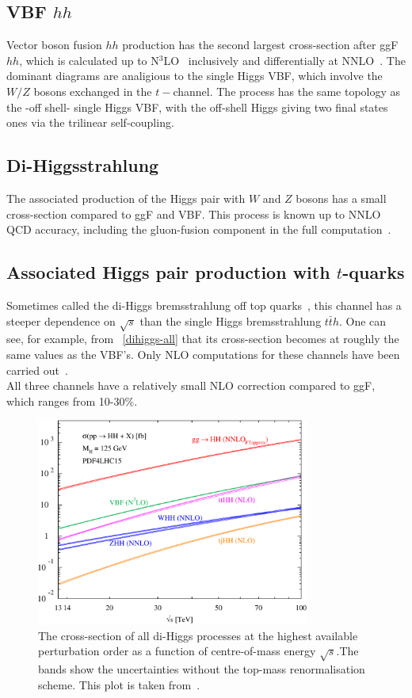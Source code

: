 \subsection{VBF $hh$}
Vector boson fusion $hh$ production has the second largest cross-section after ggF $hh$, which is calculated up to N$^3$LO~\cite{Baglio:2012np,Ling:2014sne,Dreyer:2018qbw} inclusively and differentially at NNLO~\cite{Dreyer:2018rfu}. The dominant diagrams are analigious to the single Higgs VBF, which involve the $W/Z$ bosons exchanged in the $t-$channel. The process has the same topology as the -off shell- single Higgs VBF, with the off-shell Higgs giving two final states ones via the trilinear self-coupling. 
\subsection{Di-Higgsstrahlung}
The associated production of the Higgs pair with $W$ and $Z$ bosons has a small cross-section compared to ggF and VBF. This process is known up to NNLO QCD accuracy, including the gluon-fusion component in the full computation~\cite{Li:2016nrr, Li:2017lbf}. 
\subsection{Associated Higgs pair production with $t$-quarks}
Sometimes called the di-Higgs bremsstrahlung off top quarks~\cite{DiMicco:2019ngk}, this channel has a steeper dependence on $\sqrt{s}$ than the single Higgs bremsstrahlung $t\bar t h$. One can see, for example, from ~\autoref{dihiggs-all} that its cross-section becomes at roughly the same values as the VBF's. Only NLO computations for these channels have been carried out~\cite{Frederix:2014hta}. \\ All three channels have a relatively small NLO correction compared to ggF, which ranges from 10-30\%. 
\begin{figure}[!htpb]
	\centering
	\includegraphics[width = 0.8\textwidth]{./figures/cxn_HH}
	\caption{The cross-section of all di-Higgs processes at the highest available perturbation order as a function of centre-of-mass energy $\sqrt{s}$.The bands show the uncertainties without the top-mass renormalisation scheme. This plot is taken from~\cite{DiMicco:2019ngk}.} 
	\label{dihiggs-all}
\end{figure}
%

